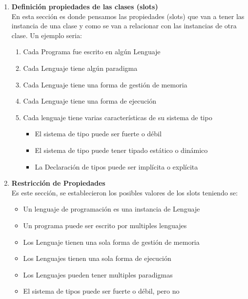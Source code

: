 \documentclass[12pt, titlepage, a4paper]{article}
\begin{document}
\begin{enumerate}
{           Ademas, también se tuvo en consideración la idea 
           de subclases y superclases (Como puede ser en el caso 
           de las Características)}
    \item {\textbf{Definición propiedades de las clases (slots)}\\
           En esta sección es donde pensamos las propiedades (slots) 
           que van a tener las instancia de una clase y como 
           se van a relacionar con las instancias de otra clase. 
           Un ejemplo seria:
           \begin{enumerate}
                \item {Cada Programa fue escrito en algún Lenguaje}
                \item {Cada Lenguaje tiene algún paradigma}
                \item {Cada Lenguaje tiene una forma de gestión de memoria}
                \item {Cada Lenguaje tiene una forma de ejecución}
                \item Cada lenguaje tiene varias características de su sistema de tipo
                \begin{itemize}
                    \item {El sistema de tipo puede ser fuerte o débil}
                    \item {El sistema de tipo puede tener tipado estático o dinámico}
                    \item {La Declaración de tipos puede ser implícita o explícita}
                \end{itemize}
           \end{enumerate}}
    \item {\textbf{Restricción de Propiedades}\\
          Es este sección, se establecieron los posibles valores de 
          los slots teniendo se: 
          \begin{itemize}
            \item {Un lenguaje de programación es una instancia de Lenguaje}
            \item {Un programa puede ser escrito por multiples lenguajes}
            \item {Los Lenguaje tienen una sola forma de gestión de memoria}
            \item {Los Lenguajes tienen una sola forma de ejecución}
            \item {Los Lenguajes pueden tener multiples paradigmas}
            \item {El sistema de tipos puede ser fuerte o débil, pero no 
}
\end{itemize}}
\end{enumerate}
\end{document}
